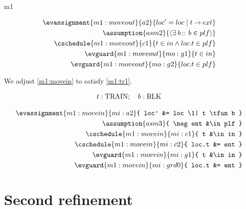 \documentclass[12pt]{amsart}
\begin{document}
\begin{machine}{m1}

\begin{align*}
\evassignment{m1:moveout}{a2}{ loc' = loc \1 | t \tfun ext }
\\ \assumption{asm2}
	{ \qexists{b}{}{b \in plf} }
\\ \cschedule{m1:moveout}{c1}{ t \in in \land loc.t \in plf }
\\ \evguard{m1:moveout}{mo:g1}{ t \in in }
\\ \evguard{m1:moveout}{mo:g2}{ loc.t \in plf }
\end{align*}

We adjust \ref{m1:movein} to satisfy \ref{m1:tr1}.


\begin{align*}
\indices{m1:movein}{	t : \Train} ; \quad
\param{m1:movein}{ b : \Blk }
\end{align*}

\begin{align*}
\evassignment{m1:movein}{mi:a2}
	{ loc' &= loc \1| t \tfun b }
\\ \assumption{asm3}
	{ \neg ent &\in plf }
\\ \cschedule{m1:movein}{mi:c1}{ t &\in in } 
\\ \cschedule{m1:movein}{mi:c2}{ loc.t &= ent }
\\ \evguard{m1:movein}{mi:g1}{ t &\in in }
\\ \evguard{m1:movein}{mi:grd0}
	{ loc.t &= ent } %
\end{align*}
%
\end{machine}

\section{Second refinement}
\end{document}
